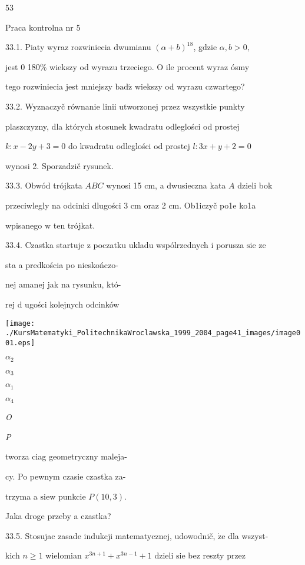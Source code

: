 \documentclass[a4paper,12pt]{article}
\begin{document}
53

Praca kontrolna nr 5

33.1. Piaty wyraz rozwiniecia dwumianu $(\alpha+b)^{18}$, gdzie $\alpha, b > 0,$

jest $0$ 180\% wiekszy od wyrazu trzeciego. $\mathrm{O}$ ile procent wyraz ósmy

tego rozwiniecia jest mniejszy $\mathrm{b}\mathrm{a}\mathrm{d}\acute{\mathrm{z}}$ wiekszy od wyrazu czwartego?

33.2. Wyznaczyč równanie linii utworzonej przez wszystkie punkty

plaszczyzny, dla których stosunek kwadratu odleglości od prostej

$k:x-2y+3=0$ do kwadratu odleglości od prostej $l:3x+y+2=0$

wynosi 2. Sporzadzič rysunek.

33.3. Obwód trójkata $ABC$ wynosi 15 cm, a dwusieczna kata $A$ dzieli bok

przeciwlegly na odcinki dlugości 3 cm oraz 2 cm. Ob1iczyč po1e ko1a

wpisanego $\mathrm{w}$ ten trójkat.

33.4. Czastka startuje $\mathrm{z}$ poczatku ukladu wspólrzednych $\mathrm{i}$ porusza $\mathrm{s}\mathrm{i}\mathrm{e}$ ze

sta a predkościa po nieskończo-

nej amanej jak na rysunku, któ- 

rej $\mathrm{d}$ ugości kolejnych odcinków
\begin{center}
\texttt{[image: ./KursMatematyki\_PolitechnikaWroclawska\_1999\_2004\_page41\_images/image001.eps]}
\end{center}
$\alpha_{2}$

$\alpha_{3}$

$\alpha_{1}$

$\alpha_{4}$

{\it O}

{\it P}

tworza ciag geometryczny maleja-

cy. Po pewnym czasie czastka za-

trzyma a $\mathrm{s}\mathrm{i}\mathrm{e} \mathrm{w}$ punkcie $P(10,3).$

Jaka droge przeby a czastka?

33.5. Stosujac zasade indukcji matematycznej, udowodnič, $\dot{\mathrm{z}}\mathrm{e}$ dla wszyst-

kich $n \geq 1$ wielomian $x^{3n+1}+x^{3n-1}+1$ dzieli $\mathrm{s}\mathrm{i}\mathrm{e}$ bez reszty przez
\end{document}
